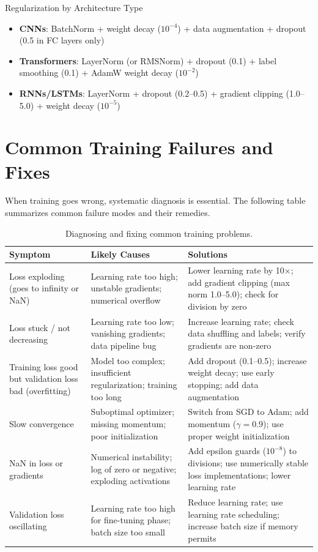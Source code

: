 \documentclass[../../editions/book2-optimization/main.tex]{subfiles}
\begin{document}
\begin{keyconcept}{Regularization by Architecture Type}
\begin{itemize}
\item \textbf{CNNs}: BatchNorm + weight decay ($10^{-4}$) + data augmentation + dropout (0.5 in FC layers only)
\item \textbf{Transformers}: LayerNorm (or RMSNorm) + dropout (0.1) + label smoothing (0.1) + AdamW weight decay ($10^{-2}$)
\item \textbf{RNNs/LSTMs}: LayerNorm + dropout (0.2--0.5) + gradient clipping (1.0--5.0) + weight decay ($10^{-5}$)
\end{itemize}
\end{keyconcept}

\section*{Common Training Failures and Fixes}

When training goes wrong, systematic diagnosis is essential. The following table summarizes common failure modes and their remedies.

\begin{table}[htbp]
\centering
\caption{Diagnosing and fixing common training problems.}
\label{tab:training-failures}
\begin{tabular}{@{}p{3.5cm}p{5.5cm}p{5.5cm}@{}}
\toprule
\textbf{Symptom} & \textbf{Likely Causes} & \textbf{Solutions} \\
\midrule
Loss exploding (goes to infinity or NaN) & Learning rate too high; unstable gradients; numerical overflow & Lower learning rate by 10$\times$; add gradient clipping (max norm 1.0--5.0); check for division by zero \\
\addlinespace
Loss stuck / not decreasing & Learning rate too low; vanishing gradients; data pipeline bug & Increase learning rate; check data shuffling and labels; verify gradients are non-zero \\
\addlinespace
Training loss good but validation loss bad (overfitting) & Model too complex; insufficient regularization; training too long & Add dropout (0.1--0.5); increase weight decay; use early stopping; add data augmentation \\
\addlinespace
Slow convergence & Suboptimal optimizer; missing momentum; poor initialization & Switch from SGD to Adam; add momentum ($\gamma = 0.9$); use proper weight initialization \\
\addlinespace
NaN in loss or gradients & Numerical instability; log of zero or negative; exploding activations & Add epsilon guards ($10^{-8}$) to divisions; use numerically stable loss implementations; lower learning rate \\
\addlinespace
Validation loss oscillating & Learning rate too high for fine-tuning phase; batch size too small & Reduce learning rate; use learning rate scheduling; increase batch size if memory permits \\
\bottomrule
\end{tabular}
\end{table}
\end{document}
